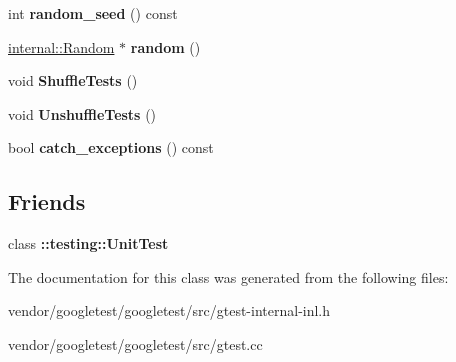 \begin{DoxyCompactItemize}
int {\bfseries random\+\_\+seed} () const
\item 
\mbox{\label{classtesting_1_1internal_1_1_unit_test_impl_ab3b45b5eb4d583219a3602011ea44347}} 
\hyperlink{classtesting_1_1internal_1_1_random}{internal\+::\+Random} $\ast$ {\bfseries random} ()
\item 
\mbox{\label{classtesting_1_1internal_1_1_unit_test_impl_aaaa38e6a4372e6bb9bbe3143a3a32b65}} 
void {\bfseries Shuffle\+Tests} ()
\item 
\mbox{\label{classtesting_1_1internal_1_1_unit_test_impl_a1ee7db3bf8284dd9dce4dc857564bce3}} 
void {\bfseries Unshuffle\+Tests} ()
\item 
\mbox{\label{classtesting_1_1internal_1_1_unit_test_impl_aa311b980783a9cfb547831f7b19e3f3a}} 
bool {\bfseries catch\+\_\+exceptions} () const
\end{DoxyCompactItemize}
\subsection*{Friends}
\begin{DoxyCompactItemize}
\item 
\mbox{\label{classtesting_1_1internal_1_1_unit_test_impl_a893404438388dec058dc5c02e8f9a014}} 
class {\bfseries \+::testing\+::\+Unit\+Test}
\end{DoxyCompactItemize}


The documentation for this class was generated from the following files\+:\begin{DoxyCompactItemize}
\item 
vendor/googletest/googletest/src/gtest-\/internal-\/inl.\+h\item 
vendor/googletest/googletest/src/gtest.\+cc\end{DoxyCompactItemize}

